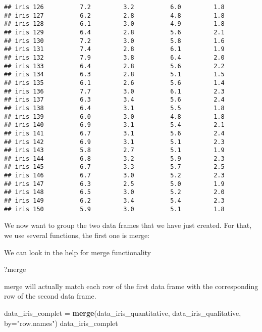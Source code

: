 \documentclass[
]{article}
\newenvironment{Shaded}{\begin{snugshade}}{\end{snugshade}}
\newcommand{\AttributeTok}[1]{\textcolor[rgb]{0.13,0.29,0.53}{#1}}
\newcommand{\FunctionTok}[1]{\textcolor[rgb]{0.13,0.29,0.53}{\textbf{#1}}}
\newcommand{\NormalTok}[1]{#1}
\newcommand{\OtherTok}[1]{\textcolor[rgb]{0.56,0.35,0.01}{#1}}
\newcommand{\StringTok}[1]{\textcolor[rgb]{0.31,0.60,0.02}{#1}}
\begin{document}
\begin{verbatim}
## iris 126          7.2         3.2          6.0         1.8
## iris 127          6.2         2.8          4.8         1.8
## iris 128          6.1         3.0          4.9         1.8
## iris 129          6.4         2.8          5.6         2.1
## iris 130          7.2         3.0          5.8         1.6
## iris 131          7.4         2.8          6.1         1.9
## iris 132          7.9         3.8          6.4         2.0
## iris 133          6.4         2.8          5.6         2.2
## iris 134          6.3         2.8          5.1         1.5
## iris 135          6.1         2.6          5.6         1.4
## iris 136          7.7         3.0          6.1         2.3
## iris 137          6.3         3.4          5.6         2.4
## iris 138          6.4         3.1          5.5         1.8
## iris 139          6.0         3.0          4.8         1.8
## iris 140          6.9         3.1          5.4         2.1
## iris 141          6.7         3.1          5.6         2.4
## iris 142          6.9         3.1          5.1         2.3
## iris 143          5.8         2.7          5.1         1.9
## iris 144          6.8         3.2          5.9         2.3
## iris 145          6.7         3.3          5.7         2.5
## iris 146          6.7         3.0          5.2         2.3
## iris 147          6.3         2.5          5.0         1.9
## iris 148          6.5         3.0          5.2         2.0
## iris 149          6.2         3.4          5.4         2.3
## iris 150          5.9         3.0          5.1         1.8
\end{verbatim}

We now want to group the two data frames that we have just created. For
that, we use several functions, the first one is merge:

We can look in the help for merge functionality

\begin{Shaded}
\begin{Highlighting}[]
\NormalTok{?merge}
\end{Highlighting}
\end{Shaded}

merge will actually match each row of the first data frame with the
corresponding row of the second data frame.

\begin{Shaded}
\begin{Highlighting}[]
\NormalTok{data\_iris\_complet }\OtherTok{=} \FunctionTok{merge}\NormalTok{(data\_iris\_quantitative, data\_iris\_qualitative, }\AttributeTok{by=}\StringTok{"row.names"}\NormalTok{)}
\NormalTok{data\_iris\_complet}
\end{Highlighting}
\end{Shaded}
\end{document}
